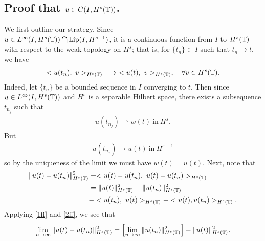 \subsection{Proof that $u \in C(I, H^s(\mathbb{T}))$.} 
We first outline our strategy. Since \\
$u \in L^\infty(I, H^s(\mathbb{T})) \bigcap \text{Lip}(I, H^{s-1})$, it is a
continuous function from $I$ to $H^s(\mathbb{T})$ with respect to the weak
topology on $H^{s}$; that is, for $\{t_n\} \subset I$ such that $t_n \to t$, we
have
\begin{equation}
\begin{split}
<u(t_n), \ v>_{H^s(\mathbb{T})} \ \longrightarrow \
<u(t), \ v>_{H^s(\mathbb{T})}, \quad \forall
v \in H^s(\mathbb{T}).
\label{1ff}
\end{split}
\end{equation}
Indeed, let $\{t_{n}\}$ be a bounded sequence in $I$ converging to $t$. Then
since $u \in L^\infty(I, H^s(\mathbb{T}))$ and $H^{s}$ is a separable Hilbert space,
there exists a subsequence $t_{n_{j}}$ such that
%
%
\begin{equation*}
\begin{split}
    u(t_{n_{j}}) \rightharpoonup w(t)  \ \text{in} \ H^{s}.
\end{split}
\end{equation*}
%
%
But
\begin{equation*}
\begin{split}
    u(t_{n_{j}}) \to u(t)  \ \text{in} \ H^{s-1}
\end{split}
\end{equation*}
so by the uniqueness of the limit we must have
$w(t) = u(t)$. Next, note that
\begin{equation}
\begin{split}
\|u(t) - u(t_n) \|_{H^s(\mathbb{T})}^2
& = <u(t) - u(t_n), \ u(t) -
u(t_n)>_{H^s(\mathbb{T})}
\\
& = \|u(t)\|_{H^s(\mathbb{T})}^2 + \|u(t_n)\|_{H^s(\mathbb{T})}^2
\\
& - <u(t_n), \
u(t) >_{H^s(\mathbb{T})} - <u(t), u(t_n)>_{H^s(\mathbb{T})}.
\label{2ff}
\end{split}
\end{equation}
Applying \eqref{1ff} and \eqref{2ff}, we see that
\begin{equation}
\begin{split}
\lim_{n \to \infty} \|u(t) - u(t_n)\|_{H^s(\mathbb{T})}^2 = \left[ \lim_{n
\to \infty} \|u(t_n)\|_{H^s(\mathbb{T})}^2
\right] - \|u(t)\|_{H^s(\mathbb{T})}^2.
\label{3ff}
\end{split}
\end{equation}
